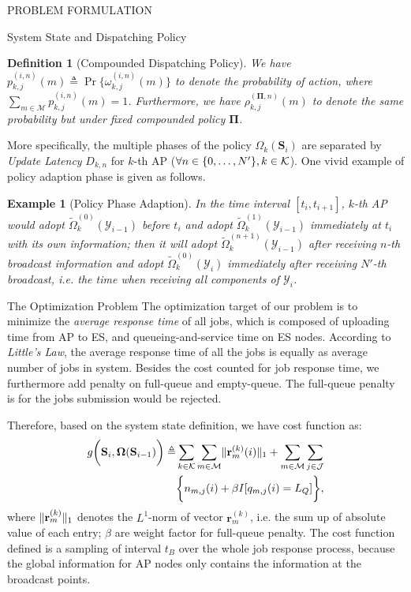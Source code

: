 \documentclass[10pt, conference, letterpaper]{IEEEtran}
\newtheorem{definition}{Definition}
\newtheorem{example}{Example}
\newcommand{\define}{\triangleq}
\newcommand{\vecG}{\boldsymbol}
\renewcommand{\vec}{\mathbf}
\DeclarePairedDelimiter{\set}{\{}{\}}
\DeclarePairedDelimiter{\Inorm}{\|}{\|_1}
\DeclarePairedDelimiter{\Paren}{\bigg(}{\bigg)}
\DeclarePairedDelimiter{\Brace}{\bigg\{}{\bigg\}}
\newcommand{\apSet}{\mathcal{K}}
\newcommand{\esSet}{\mathcal{M}}
\newcommand{\jSpace}{\mathcal{J}}
\newcommand{\Stat}{\mathbf{S}}
\newcommand{\Obsv}{\mathcal{Y}}
\newcommand{\Policy}{\boldsymbol{\Omega}}
\begin{document}
\begin{section}{PROBLEM FORMULATION}
\begin{subsection}{System State and Dispatching Policy}
\begin{definition}[Compounded Dispatching Policy]
                We have $p^{(i,n)}_{k,j}(m) \define \Pr\{\omega^{(i,n)}_{k,j}(m)\}$ to denote the probability of action, where $\sum_{m\in\esSet} p^{(i,n)}_{k,j}(m) = 1$. Furthermore, we have $\rho^{(\vecG{\Pi},n)}_{k,j}(m)$ to denote the same probability but under fixed compounded policy $\vecG{\Pi}$.
            \end{definition}
            More specifically, the multiple phases of the policy $\Omega_k(\Stat_i)$ are separated by \emph{Update Latency} $D_{k,n}$ for $k$-th AP ($\forall n\in\set{0,\dots,N'}, k\in\apSet$). One vivid example of policy adaption phase is given as follows.
            \begin{example}[Policy Phase Adaption]
                In the time interval $[t_{i}, t_{i+1}]$, $k$-th AP would adopt $\tilde{\Omega}^{(0)}_k(\Obsv_{i-1})$ before $t_i$ and adopt $\tilde{\Omega}^{(1)}_k(\Obsv_{i-1})$ immediately at $t_i$ with its own information; then it will adopt $\tilde{\Omega}^{(n+1)}_k(\Obsv_{i-1})$ after receiving $n$-th broadcast information and adopt $\tilde{\Omega}^{(0)}_k(\Obsv_{i})$ immediately after receiving $N'$-th broadcast, i.e. the time when receiving all components of $\Obsv_{i}$.
            \end{example}
        \end{subsection}

        \begin{subsection}{The Optimization Problem}
            The optimization target of our problem is to minimize the \emph{average response time} of all jobs, which is composed of uploading time from AP to ES, and queueing-and-service time on ES nodes. According to \emph{Little's Law}, the average response time of all the jobs is equally as average number of jobs in system.
            Besides the cost counted for job response time, we furthermore add penalty on full-queue and empty-queue.
            The full-queue penalty is for the jobs submission would be rejected.

            Therefore, based on the system state definition, we have cost function as:
            \begin{align}
                g\Paren{\Stat_{i}, \Policy(\Stat_{i-1})} \define& \sum_{k\in\apSet}\sum_{m\in\esSet} \Inorm{\vec{r}^{(k)}_{m}(i)} + \sum_{m\in\esSet}\sum_{j\in\jSpace}
                \nonumber\\
                &\Brace{
                    n_{m,j}(i) + \beta I[q_{m,j}(i)=L_Q]
                },
            \end{align}
            where $\Inorm{\vec{r}^{(k)}_{m}}$ denotes the $L^1$-norm of vector $\vec{r}^{(k)}_{m}$, i.e. the sum up of absolute value of each entry; $\beta$ are weight factor for full-queue penalty.
            {\color{red}The cost function defined is a sampling of interval $t_B$ over the whole job response process, because the global information for AP nodes only contains the information at the broadcast points.}


\end{subsection}
\end{section}
\end{document}
